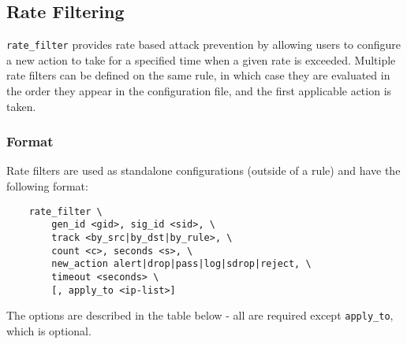 \documentclass[english]{report}
\begin{document}
\subsection{Rate Filtering}
\label{rate_filtering}

\texttt{rate\_filter} provides rate based attack prevention by allowing users
to configure a new action to take for a specified time when a given rate is
exceeded.  Multiple rate filters can be defined on the same rule, in which case
they are evaluated in the order they appear in the configuration file, and the
first applicable action is taken.  

\subsubsection{Format}

Rate filters are used as standalone configurations (outside of a rule) and have
the following format:

\begin{verbatim}
    rate_filter \
        gen_id <gid>, sig_id <sid>, \
        track <by_src|by_dst|by_rule>, \
        count <c>, seconds <s>, \
        new_action alert|drop|pass|log|sdrop|reject, \
        timeout <seconds> \
        [, apply_to <ip-list>]
\end{verbatim}

The options are described in the table below - all are required except
\texttt{apply\_to}, which is optional.
\end{document}

